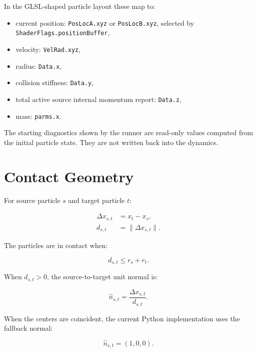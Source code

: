 In the GLSL-shaped particle layout these map to:

\begin{itemize}[leftmargin=*]
    \item current position: \texttt{PosLocA.xyz} or \texttt{PosLocB.xyz},
    selected by \texttt{ShaderFlags.positionBuffer},
    \item velocity: \texttt{VelRad.xyz},
    \item radius: \texttt{Data.x},
    \item collision stiffness: \texttt{Data.y},
    \item total active source internal momentum report: \texttt{Data.z},
    \item mass: \texttt{parms.x}.
\end{itemize}

The starting diagnostics shown by the runner are read-only values computed from
the initial particle state.  They are not written back into the dynamics.

\section{Contact Geometry}
\label{sec:contact-geometry}

For source particle $s$ and target particle $t$:

\begin{equation}
\begin{aligned}
\Delta x_{s,t} &= x_t - x_s, \\
d_{s,t} &= \lVert \Delta x_{s,t} \rVert.
\end{aligned}
\end{equation}

The particles are in contact when:

\begin{equation}
d_{s,t} \le r_s + r_t.
\end{equation}

When $d_{s,t} > 0$, the source-to-target unit normal is:

\begin{equation}
\hat{n}_{s,t} = \frac{\Delta x_{s,t}}{d_{s,t}}.
\end{equation}

When the centers are coincident, the current Python implementation uses the
fallback normal:

\begin{equation}
\hat{n}_{s,t} = (1,0,0).
\end{equation}

